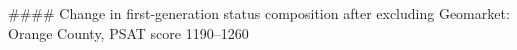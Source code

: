 #### Change in first-generation status composition after excluding Geomarket: Orange County, PSAT score 1190–1260
